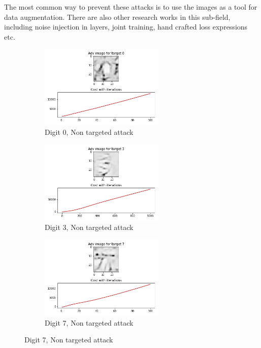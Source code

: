 The most common way to prevent these attacks is to use the images as a tool for data augmentation. There are also other research works in this sub-field, including noise injection in layers, joint training, hand crafted loss expressions etc. 


\begin{figure}[!htbp]
\begin{subfigure}
\centering
\includegraphics[angle=0,width=0.65\textwidth]{assign-2/logs/adv/adding_noise/adv-0.jpg}
\caption{Digit 0, Non targeted attack}
\end{subfigure}
\begin{subfigure}
\centering
\includegraphics[angle=0,width=0.65\textwidth]{assign-2/logs/adv/adding_noise/adv-3.jpg}
\caption{Digit 3, Non targeted attack}
\end{subfigure}
\begin{subfigure}
\centering
\includegraphics[angle=0,width=0.65\textwidth]{assign-2/logs/adv/adding_noise/adv-7.jpg}
\caption{Digit 7, Non targeted attack} 
\end{subfigure}
\end{figure}
